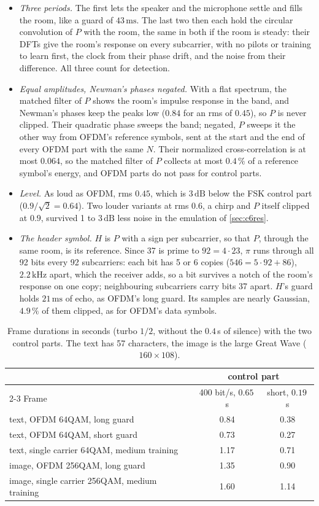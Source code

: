 \documentclass[11pt,a4paper]{article}
\newcommand{\kHz}{\,\mathrm{kHz}}
\newcommand{\ms}{\,\mathrm{ms}}
\newcommand{\dB}{\,\mathrm{dB}}
\theoremstyle{remark}
\begin{document}
\begin{itemize}
\item \emph{Three periods.} The first lets the speaker and the microphone settle and fills the room, like a guard of $43\ms$. The last two then each hold the circular convolution of $P$ with the room, the same in both if the room is steady: their DFTs give the room's response on every subcarrier, with no pilots or training to learn first, the clock from their phase drift, and the noise from their difference. All three count for detection.
\item \emph{Equal amplitudes, Newman's phases negated.} With a flat spectrum, the matched filter of $P$ shows the room's impulse response in the band, and Newman's phases keep the peaks low ($0.84$ for an rms of $0.45$), so $P$ is never clipped. Their quadratic phase sweeps the band; negated, $P$ sweeps it the other way from OFDM's reference symbols, sent at the start and the end of every OFDM part with the same $N$. Their normalized cross-correlation is at most $0.064$, so the matched filter of $P$ collects at most $0.4\,\%$ of a reference symbol's energy, and OFDM parts do not pass for control parts.
\item \emph{Level.} As loud as OFDM, rms $0.45$, which is $3\dB$ below the FSK control part ($0.9/\sqrt2 = 0.64$). Two louder variants at rms $0.6$, a chirp and $P$ itself clipped at $0.9$, survived 1 to $3\dB$ less noise in the emulation of \cref{sec:c6res}.
\item \emph{The header symbol.} $H$ is $P$ with a sign per subcarrier, so that $P$, through the same room, is its reference. Since 37 is prime to $92 = 4 \cdot 23$, $\pi$ runs through all 92 bits every 92 subcarriers: each bit has 5 or 6 copies ($546 = 5 \cdot 92 + 86$), $2.2\kHz$ apart, which the receiver adds, so a bit survives a notch of the room's response on one copy; neighbouring subcarriers carry bits 37 apart. $H$'s guard holds $21\ms$ of echo, as OFDM's long guard. Its samples are nearly Gaussian, $4.9\,\%$ of them clipped, as for OFDM's data symbols.
\end{itemize}

\begin{table}[ht]
\centering
\caption{Frame durations in seconds (turbo $1/2$, without the $0.4$\,s of silence) with the two control parts. The text has 57 characters, the image is the large Great Wave ($160 \times 108$).}
\label{tab:c6dur}
\small
\begin{tabular}{lcc}
\toprule
& \multicolumn{2}{c}{control part}\\
\cmidrule(lr){2-3}
Frame & 400 bit/s, $0.65$\,s & short, $0.19$\,s\\
\midrule
text, OFDM 64QAM, long guard & 0.84 & 0.38\\
text, OFDM 64QAM, short guard & 0.73 & 0.27\\
text, single carrier 64QAM, medium training & 1.17 & 0.71\\
image, OFDM 256QAM, long guard & 1.35 & 0.90\\
image, single carrier 256QAM, medium training & 1.60 & 1.14\\
\bottomrule
\end{tabular}
\end{table}
\end{document}
